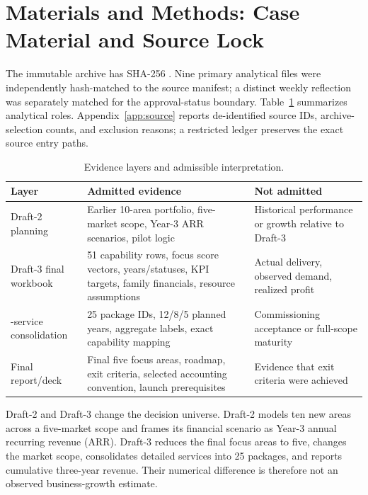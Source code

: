 \documentclass[systems,article,submit,moreauthors]{Definitions/mdpi}
\begin{document}
\section{Materials and Methods: Case Material and Source Lock}
The immutable archive has SHA-256
\texttt{}.
Nine primary analytical files were independently hash-matched to the source manifest; a distinct weekly reflection was separately matched for the approval-status boundary. Table~\ref{tab:evidence} summarizes analytical roles. Appendix~\ref{app:source} reports de-identified source IDs, archive-selection counts, and exclusion reasons; a restricted ledger preserves the exact source entry paths.

\begin{table}[H]
\centering
\small
\caption{Evidence layers and admissible interpretation.}
\label{tab:evidence}
\begin{tabularx}{\linewidth}{>{\raggedright\arraybackslash}p{2.7cm} X X}
\toprule
Layer & Admitted evidence & Not admitted \\
\midrule
Draft-2 planning & Earlier 10-area portfolio, five-market scope, Year-3 ARR scenarios, pilot logic & Historical performance or growth relative to Draft-3 \\
Draft-3 final workbook & 51 capability rows, focus score vectors, years/statuses, KPI targets, family financials, resource assumptions & Actual delivery, observed demand, realized profit \\
25-service consolidation & 25 package IDs, 12/8/5 planned years, aggregate labels, exact capability mapping & Commissioning acceptance or full-scope maturity \\
Final report/deck & Final five focus areas, roadmap, exit criteria, selected accounting convention, launch prerequisites & Evidence that exit criteria were achieved \\
\bottomrule
\end{tabularx}
\end{table}

Draft-2 and Draft-3 change the decision universe. Draft-2 models ten new areas across a five-market scope and frames its financial scenario as Year-3 annual recurring revenue (ARR). Draft-3 reduces the final focus areas to five, changes the market scope, consolidates detailed services into 25 packages, and reports cumulative three-year revenue. Their numerical difference is therefore not an observed business-growth estimate.
\end{document}
